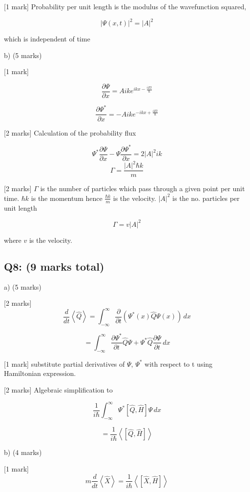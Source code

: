 \documentclass[a4paper,11pt]{article}
\begin{document}
[1 mark] Probability per unit length is the modulus of the wavefunction squared,

\[ |\Psi(x,t)|^2 = |A|^2 \]

which is independent of time

b) (5 marks)

[1 mark] 

\[ \frac{\partial \Psi}{\partial x} = Aik e^{ikx - \frac{iEt}{\hbar}} \] 

\[ \frac{\partial \Psi^{*}}{\partial x} = -Aik e^{-ikx + \frac{iEt}{\hbar}} \] 

[2 marks] Calculation of the probability flux

\[\Psi^{*}\frac{\partial \Psi}{\partial x} - \Psi\frac{\partial \Psi^{*}}{\partial x} = 2|A|^{2}ik\]
\[\Gamma = \frac{\left|A \right|^{2}\hbar k}{m} \]  

[2 marks] \( \Gamma \) is the number of particles which pass through a given point per unit time. \( \hbar k \) is the momentum hence \( \frac{\hbar k }{m} \) is the velocity.  \( |A|^2 \) is the no. particles per unit length

 \[\Gamma = v \left|A \right|^{2} \]  

where \(v\) is the velocity. 

\subsection*{Q8: (9 marks total) }

a) (5 marks)

[2 marks] \[ \frac{d}{dt} \left< \hat{Q} \right> = \int_{-\infty}^{\infty} \frac{\partial}{\partial t} \left( \Psi^{*}(x) \hat{Q} \Psi(x) \right) \, dx \]

\[ = \int_{-\infty}^{\infty} \frac{\partial \Psi^{*}}{\partial t}\hat{Q}\Psi + \Psi^{*}\hat{Q}\frac{\partial \Psi}{\partial t} \, dx \]

[1 mark] substitute partial derivatives of \(\Psi\), \(\Psi^{*}\) with respect to t using Hamiltonian expression.

[2 marks] Algebraic simplification to 

\[ \frac{1}{i\hbar} \int_{-\infty}^{\infty} \Psi^{*} \left [ \hat{Q}, \hat{H} \right ] \Psi \, dx \]

\[ = \frac{1}{i\hbar} \left<  \left [ \hat{Q}, \hat{H} \right ] \right> \]

b) (4 marks)

[1 mark]\[m \frac{d}{dt}  \left<\hat{X}\right> = \frac{1}{i\hbar}\left< \left[ \hat{X}, \hat{H} \right] \right> \] 
\end{document}
